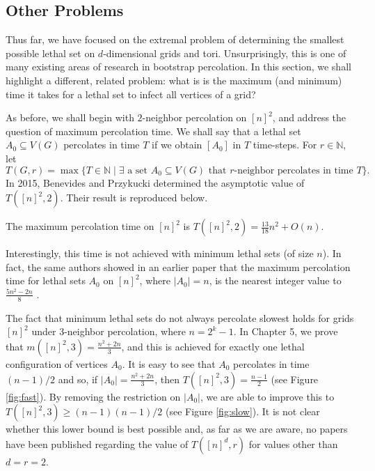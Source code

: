 \subsection{Other Problems}

Thus far, we have focused on the extremal problem of determining the smallest possible lethal set on $d$-dimensional grids and tori. Unsurprisingly, this is one of many existing areas of research in bootstrap percolation. In this section, we shall highlight a different, related problem: what is is the maximum (and minimum) time it takes for a lethal set to infect all vertices of a grid?

As before, we shall begin with $2$-neighbor percolation on $[n]^2$, and address the question of maximum percolation time. We shall say that a lethal set $A_0 \subseteq V(G)$ percolates in time $T$ if we obtain $[A_0]$ in $T$ time-steps. For $r \in \mathbb{N}$, let
$$T(G,r) = \max\{T \in \mathbb{N} \mid \exists \text{ a set }A_0 \subseteq V(G)\text{ that }r\text{-neighbor percolates in time }T\}.$$
In 2015, Benevides and Przykucki \cite{benevides2015maximum} determined the asymptotic value of $T([n]^2,2)$. Their result is reproduced below.

\begin{thm}
The maximum percolation time on $[n]^2$ is $T([n]^2,2) = \frac{13}{18}n^2 + O(n)$. 
\end{thm}

Interestingly, this time is not achieved with minimum lethal sets (of size $n$). In fact, the same authors showed in an earlier paper that the maximum percolation time for lethal sets $A_0$ on $[n]^2$, where $|A_0| = n$, is the nearest integer value to $\frac{5n^2-2n}{8}$ \cite{benevides2013slowly}. 

The fact that minimum lethal sets do not always percolate slowest holds for grids $[n]^2$ under 3-neighbor percolation, where $n=2^k-1$. In Chapter 5, we prove that $m([n]^2,3) = \frac{n^2+2n}{3}$, and this is achieved for exactly one lethal configuration of vertices $A_0$. It is easy to see that $A_0$ percolates in time $(n-1)/2$ and so, if $|A_0| = \frac{n^2+2n}{3}$, then $T([n]^2,3) = \frac{n-1}{2}$ (see Figure \ref{fig:fast}). By removing the restriction on $|A_0|$, we are able to improve this to $T([n]^2,3) \geq (n-1)(n-1)/2$ (see Figure \ref{fig:slow}). It is not clear whether this lower bound is best possible and, as far as we are aware, no papers have been published regarding the value of $T([n]^d,r)$ for values other than $d=r=2$. 

